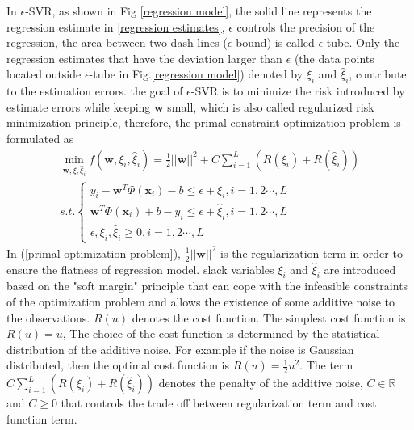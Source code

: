  In $\epsilon$-SVR, as shown in Fig \ref{regression model}, the solid line represents the regression estimate in \ref{regression estimates}, $\epsilon$ controls the precision of the regression, the area between two dash lines ($\epsilon$-bound) is called $\epsilon$-tube. Only the regression estimates that have the deviation larger than $\epsilon$ (the data points located outside $\epsilon$-tube in Fig.\ref{regression model}) denoted by $\xi_{i}$ and $\hat{\xi}_{i}$, contribute to the estimation errors.
the goal of $\epsilon$-SVR is to minimize the risk introduced by estimate errors while keeping $\mathbf{w}$ small, which is also called regularized risk minimization principle, therefore, the primal constraint optimization problem is formulated as
\begin{eqnarray}
\nonumber
\min_{\mathbf{w}, \xi, \hat{\xi}_{i}} f(\mathbf{w}, \xi_{i}, \hat{\xi}_{i})=\frac{1}{2}||\mathbf{w}||^{2}+C\sum_{i=1}^{L}(R(\xi_{i})+R(\hat{\xi}_{i}))\\
s.t. \left\{\begin{array}{ll}
y_{i}-\mathbf{w}^{T}\Phi(\mathbf{x}_{i})-b \leq \epsilon+\xi_{i}, i=1,2\cdots, L \\
\mathbf{w}^{T}\Phi(\mathbf{x}_{i})+b-y_{i} \leq \epsilon+\hat{\xi}_{i}, i=1,2\cdots, L\\
\epsilon, \xi_{i},\hat{\xi}_{i} \geq 0, i=1,2\cdots, L
\end{array}\right.
\label{primal optimization problem}
\end{eqnarray} 
In (\ref{primal optimization problem}), $\frac{1}{2}||\mathbf{w}||^{2}$ is the regularization term in order to ensure the flatness of regression model.
 slack variables $\xi_{i}$ and $\hat{\xi}_{i}$ are introduced based on the "soft margin" principle\cite{cortes1995support} that can cope with the infeasible constraints of the optimization problem and allows the existence of some additive noise to the observations. $R(u)$ denotes the cost function. The simplest cost function is $R(u)=u$, The choice of the cost function is determined by the statistical distribution of the additive noise\cite{smola2004tutorial}. For example if the noise is Gaussian distributed, then the optimal cost function is $R(u)=\frac{1}{2}u^{2}$. The term $C\sum_{i=1}^{L}(R(\xi_{i})+R(\hat{\xi}_{i}))$ denotes the penalty of the additive noise, $C\in \mathbb{R}$ and $C\geq 0$ that controls the trade off between regularization term and cost function term.
 

